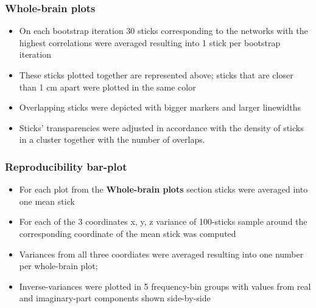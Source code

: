 \documentclass{article}
\begin{document}
\subsubsection{Whole-brain plots}

\begin{itemize}
    \item On each bootstrap iteration 30 sticks corresponding to the networks
          with the highest correlations were averaged resulting into 1 stick per bootstrap iteration
    \item These sticks plotted together are represented above;
          sticks that are closer than 1 cm apart were plotted in the same color
    \item Overlapping sticks were depicted with bigger markers and larger linewidths
    \item Sticks' transparencies were adjusted in accordance with the density of sticks in
          a cluster together with the number of overlaps.
\end{itemize}

\subsubsection{Reproducibility bar-plot}

\begin{itemize}
    \item For each plot from the \textbf{Whole-brain plots} section sticks were
          averaged into one mean stick
    \item For each of the 3 coordinates x, y, z variance of 100-sticks sample
          around the corresponding coordinate of the mean stick was computed
    \item Variances from all three coordiates were averaged resulting into one
          number per whole-brain plot;
    \item Inverse-variances were plotted in 5 frequency-bin groups with
          values from real and imaginary-part components shown side-by-side
\end{itemize}

\end{document}
